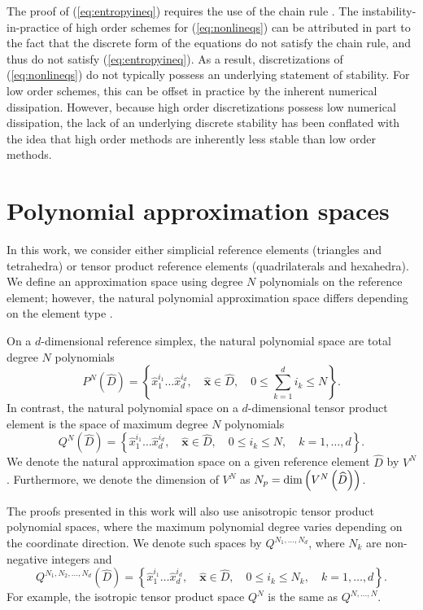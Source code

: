 \documentclass{svjour3}                     %
\renewcommand{\hat}{\widehat}
\newcommand{\LRp}[1]{\left( #1 \right)}
\newcommand{\LRc}[1]{\left\{ #1 \right\}}
\begin{document}
The proof of (\ref{eq:entropyineq}) requires the use of the chain rule \cite{mock1980systems, harten1983symmetric, dafermos2005compensated}.  The instability-in-practice of high order schemes for (\ref{eq:nonlineqs}) can be attributed in part to the fact that the discrete form of the equations do not satisfy the chain rule, and thus do not satisfy (\ref{eq:entropyineq}).  As a result, discretizations of (\ref{eq:nonlineqs}) do not typically possess an underlying statement of stability.  For low order schemes, this can be offset in practice by the inherent numerical dissipation.  However, because high order discretizations possess low numerical dissipation, the lack of an underlying discrete stability has been conflated with the idea that high order methods are inherently less stable than low order methods.

\section{Polynomial approximation spaces}
\label{sec:approx}

In this work, we consider either simplicial reference elements (triangles and tetrahedra) or tensor product reference elements (quadrilaterals and hexahedra).  We define an approximation space using degree $N$ polynomials on the reference element; however, the natural polynomial approximation space differs depending on the element type \cite{chan2015gpu}.

On a $d$-dimensional reference simplex, the natural polynomial space are total degree $N$ polynomials 
\[
P^N\LRp{\hat{D}} = \LRc{\hat{x}_1^{i_1}\ldots\hat{x}_d^{i_d}, \quad \hat{\bm{x}} \in \hat{D}, \quad 0\leq \sum_{k=1}^d i_k \leq N}.
\]
In contrast, the natural polynomial space on a $d$-dimensional tensor product element is the space of maximum degree $N$ polynomials
\[
Q^N\LRp{\hat{D}} = \LRc{\hat{x}_1^{i_1}\ldots\hat{x}_d^{i_d}, \quad \hat{\bm{x}} \in \hat{D}, \quad 0\leq i_k \leq N, \quad k = 1,\ldots, d}.
\]
We denote the natural approximation space on a given reference element $\hat{D}$ by $V^N$.  Furthermore, we denote the dimension of $V^N$ as $N_p = {\rm dim}\LRp{V^N\LRp{\hat{D}}}$.  

The proofs presented in this work will also use anisotropic tensor product polynomial spaces, where the maximum polynomial degree varies depending on the coordinate direction.  We denote such spaces by $Q^{N_1, \ldots, N_d}$, where $N_k$ are non-negative integers and
\[
Q^{N_1, N_2, \ldots, N_d}\LRp{\hat{D}} = \LRc{\hat{x}_1^{i_1}\ldots\hat{x}_d^{i_d}, \quad \hat{\bm{x}} \in \hat{D}, \quad 0\leq i_k \leq N_k, \quad k = 1,\ldots, d}.
\]
For example, the isotropic tensor product space $Q^N$ is the same as $Q^{N,\ldots,N}$.
\end{document}
